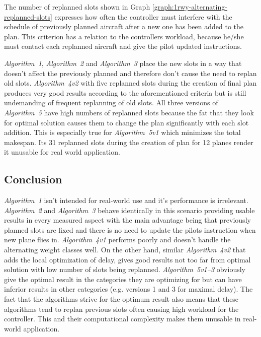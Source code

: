 The number of replanned slots shown in Graph \ref{graph:1rwy-alternating-replanned-slots} expresses how often the controller must interfere with the schedule of previously planned aircraft after a new one has been added to the plan. This criterion has a relation to the controllers workload, because he/she must contact each replanned aircraft and give the pilot updated instructions.

{\em Algorithm~1}, {\em Algorithm~2} and {\em Algorithm~3} place the new slots in a way that doesn't affect the previously planned and therefore don't cause the need to replan old slots. {\em Algorithm~4v2} with five replanned slots during the creation of final plan produces very good results according to the aforementioned criteria but is still undemanding of frequent replanning of old slots. All three versions of {\em Algorithm~5} have high numbers of replanned slots because the fat that they look for optimal solution causes them to change the plan significantly with each slot addition. This is especially true for {\em Algorithm~5v1} which minimizes the total makespan. Its 31 replanned slots during the creation of plan for 12 planes render it unusable for real world application.

\subsection{Conclusion}

{\em Algorithm~1} isn't intended for real-world use and it's performance is irrelevant. {\em Algorithm~2} and {\em Algorithm~3} behave identically in this scenario providing usable results in every measured aspect with the main advantage being that previously planned slots are fixed and there is no need to update the pilots instruction when new plane flies in. {\em Algorithm~4v1} performs poorly and doesn't handle the alternating weight classes well. On the other hand, similar {\em Algorithm~4v2} that adds the local optimization of delay, gives good results not too far from optimal solution with low number of slots being replanned. {\em Algorithm~5v1–3} obviously give the optimal result in the categories they are optimizing for but can have inferior results in other categories (e.g. versions 1 and 3 for maximal delay). The fact that the algorithms strive for the optimum result also means that these algorithms tend to replan previous slots often causing high workload for the controller. This and their computational complexity makes them unusable in real-world application.

